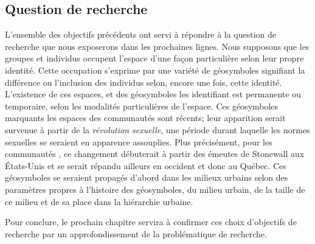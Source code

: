 \subsection*{Question de recherche} %
\label{sub:hypothese}
L'ensemble des objectifs précédents ont servi à répondre à la question de recherche que nous exposerons dans les prochaines lignes.
Nous supposons que les groupes et individus \lgbt{} occupent l'espace d'une façon particulière selon leur propre identité.
Cette occupation s'exprime par une variété de géosymboles signifiant la différence ou l'inclusion des individus selon, encore une fois, cette identité.
L'existence de ces espaces, et des géosymboles les identifiant est permanente ou temporaire, selon les modalités particulières de l'espace.
Ces géosymboles marquants les espaces des communautés \lgbt{} sont récents; leur apparition serait survenue à partir de la \emph{révolution sexuelle}, une période durant laquelle les normes sexuelles se seraient en apparence assouplies.
Plus précisément, pour les communautés \lgbt{}, ce changement débuterait à partir des émeutes de Stonewall aux États-Unis et se serait répandu ailleurs en occident et donc au Québec.
Ces géosymboles se seraient propagés d'abord dans les milieux urbains selon des paramètres propres à l'histoire des géosymboles, du milieu urbain, de la taille de ce milieu et de sa place dans la hiérarchie urbaine.

Pour conclure, le prochain chapitre servira à confirmer ces choix d'objectifs de recherche par un approfondissement de la problématique de recherche.

